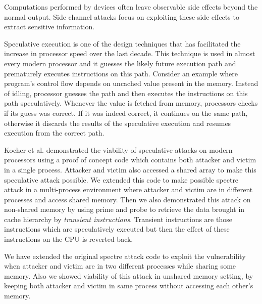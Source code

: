 Computations performed by devices often leave observable side effects beyond the normal output. Side channel attacks focus on exploiting these side effects to extract sensitive information. 

Speculative execution is one of the design techniques that has facilitated the increase in processor speed over the last decade. This technique is used in almost every modern processor and it guesses the likely future execution path and prematurely executes instructions on this path. Consider an example where program's control flow depends on uncached value present in the memory. Instead of idling, processor guesses the path and then executes the instructions on this path speculatively. Whenever the value is fetched from memory, processors checks if its guess was correct. If it was indeed correct, it continues on the same path, otherwise it discards the results of the speculative execution and resumes execution from the correct path.

Kocher et al.\cite{spectre} demonstrated the viability of speculative attacks on modern processors using a proof of concept code which contains both attacker and victim in a single process. Attacker and victim also accessed a shared array to make this speculative attack possible. We extended this code to make possible spectre attack in a multi-process environment where attacker and victim are in different processes and access shared memory. Then we also demonstrated this attack on non-shared memory by using prime and probe to retrieve the data brought in cache hierarchy by \textit{transient instructions}. Transient instructions are those instructions which are speculatively executed but then the effect of these instructions on the CPU is reverted back.

We have extended the original spectre attack code to exploit the vulnerability when attacker and victim are in two different processes while sharing some memory. Also we showed viability of this attack in unshared memory setting, by keeping both attacker and victim in same process without accessing each other's memory.
